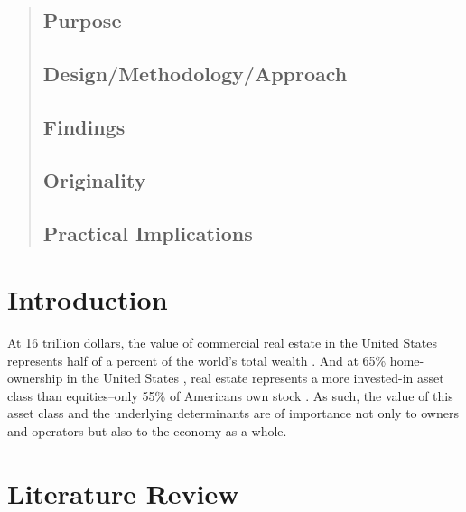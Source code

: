 \begin{abstract}


\subsection*{Purpose}


\subsection*{Design/Methodology/Approach}

\subsection*{Findings}

\subsection*{Originality}

\subsection*{Practical Implications}


\end{abstract}

\pagebreak
\setlength{\parindent}{4em}
\setlength{\parskip}{1em}

\section{Introduction}
\label{intro}
At 16 trillion dollars, the value of commercial real estate in the United States \citep*{NAREITsize} represents half of a percent of the world's total wealth \citep*{CSsize}. And at 65\% home-ownership in the United States \citep*{fred_2020}, real estate represents a more invested-in asset class than equities--only 55\% of Americans own stock \citep*{saad_2020}. As such, the value of this asset class and the underlying determinants are of importance not only to owners and operators but also to the economy as a whole. 


\section{Literature Review}


